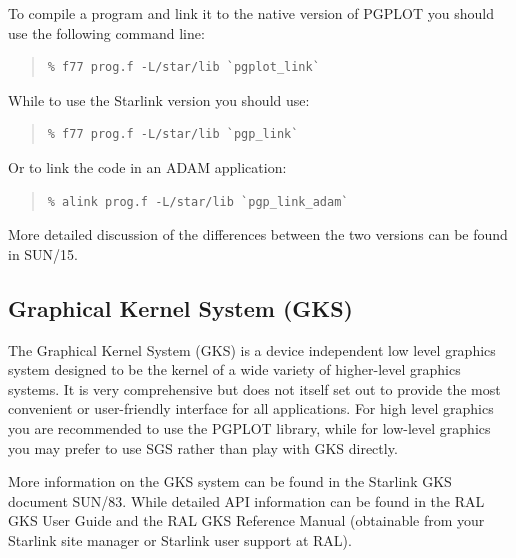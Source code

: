 \documentclass[twoside,11pt]{article}
\newcommand{\htmladdnormallink}[2]{#1}
\newcommand{\htmlref}[2]{#1}
\newcommand{\xref}[3]{#1}
\newcommand{\xlabel}[1]{}
\begin{document}
To compile a program and link it to the native version of PGPLOT you
should use the following command line:

\small
\begin{quote}
\begin{verbatim}
% f77 prog.f -L/star/lib `pgplot_link`
\end{verbatim}
\end{quote}
\normalsize

While to use the Starlink version you should use:

\small
\begin{quote}
\begin{verbatim}
% f77 prog.f -L/star/lib `pgp_link`
\end{verbatim}
\end{quote}
\normalsize

Or to link the code in an \xref{ADAM}{sun113}{} application:

\small
\begin{quote}
\begin{verbatim}
% alink prog.f -L/star/lib `pgp_link_adam`
\end{verbatim}
\end{quote}
\normalsize

More detailed discussion of the differences between the two versions
can be found in \xref{SUN/15}{sun15}{}.

\subsection{\xlabel{sc15_gks}Graphical Kernel System (GKS)\label{sc15_gks}}

The Graphical Kernel System (GKS) is a device independent low level
graphics system designed to be the kernel of a wide variety of
higher-level graphics systems. It is very comprehensive but does not
itself set out to provide the most convenient or user-friendly
interface for all applications. For high level graphics you are
recommended to use the \htmlref{PGPLOT}{sc15_pgplot} library, while
for low-level graphics you may prefer to use \htmlref{SGS}{sc15_sgs}
rather than play with GKS directly.

More information on the GKS system can be found in the Starlink GKS
document \xref{SUN/83}{sun83}{}. While detailed API information can be
found in the \htmladdnormallink{RAL GKS User
Guide}{http://www.itd.clrc.ac.uk/Publications/RAL-GKS/gksguide.html}
and the \htmladdnormallink{RAL GKS Reference
Manual}{http://www.itd.clrc.ac.uk/Publications/RAL-GKS/gks_cat.html}
(obtainable from your Starlink site manager or Starlink user support
at RAL).
\end{document}
